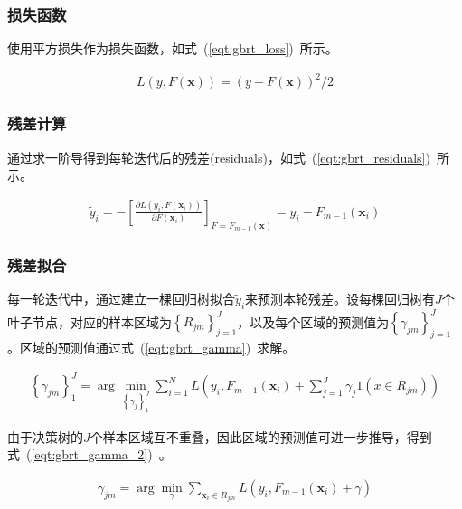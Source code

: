 \documentclass[a4paper,11pt,         %
               ]{article}
\begin{document}
\subsubsection{损失函数}

使用平方损失作为损失函数，如式~(\ref{eqt:gbrt_loss})~所示。

\begin{eqnarray}
  \label{eqt:gbrt_loss}
L\left ( y,F\left ( \mathbf{x} \right ) \right ) = \left ( y-F \left ( \mathbf{x} \right )\right )^{2} / 2
\end{eqnarray}

\subsubsection{残差计算}

通过求一阶导得到每轮迭代后的残差(residuals)，如式~(\ref{eqt:gbrt_residuals})~所示。

\begin{eqnarray}
  \label{eqt:gbrt_residuals}
\tilde{y}_{i}=-\left [ \frac{\partial L\left ( y_{i},F\left ( \mathbf{x}_{i} \right ) \right )}{\partial F\left ( \mathbf{x}_{i} \right )} \right ]_{F=F_{m-1}\left ( \mathbf{x} \right ) } = y_{i}-F_{m-1}\left ( \mathbf{x}_{i} \right )
\end{eqnarray}

\subsubsection{残差拟合}

每一轮迭代中，通过建立一棵回归树拟合$\tilde{y}_{i}$来预测本轮残差。设每棵回归树有$J$个叶子节点，对应的样本区域为$\left \{ R_{jm} \right \}_{j=1}^{J}$，以及每个区域的预测值为$\left \{ \gamma _{jm} \right \}_{j=1}^{J}$。区域的预测值通过式~(\ref{eqt:gbrt_gamma})~求解。

\begin{eqnarray}
  \label{eqt:gbrt_gamma}
\left \{ \gamma _{jm} \right \}_{1}^{J} = \arg \min_{\left \{ \gamma _{j} \right \}_{1}^{J}} {\sum _{i=1}^{N}{ L\left ( y_{i}, F_{m-1}\left ( \mathbf{x}_{i} \right ) + \sum _{j=1}^{J}{\gamma _{j}1\left ( x \in R_{jm} \right )} \right ) }}
\end{eqnarray}

由于决策树的$J$个样本区域互不重叠，因此区域的预测值可进一步推导，得到式~(\ref{eqt:gbrt_gamma_2})~。

\begin{eqnarray}
  \label{eqt:gbrt_gamma_2}
 \gamma _{jm} = \arg \min_{ \gamma } {\sum _{\mathbf{x}_{i} \in R_{jm}}{ L\left ( y_{i}, F_{m-1}\left ( \mathbf{x}_{i} \right ) + \gamma \right ) }}
\end{eqnarray}
\end{document}
